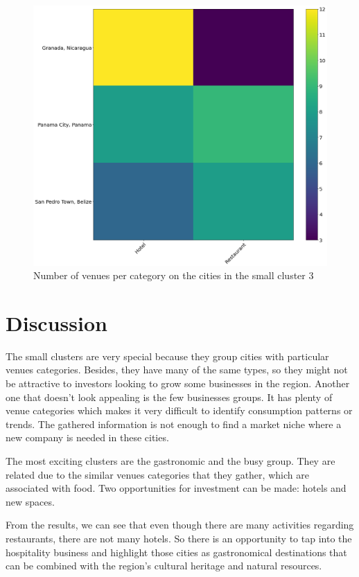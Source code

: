 \documentclass[letterpaper,12pt]{article}
\begin{document}
\begin{figure}[h]
    \centering
    \includegraphics[width=\textwidth]{images/cluster6.png}
    \caption{Number of venues per category on the cities in the small cluster 3}
    \label{fig:cluster_5}
\end{figure}



\section{Discussion}

The small clusters are very special because they group cities with particular venues categories. Besides, they have many of the same types, so they might not be attractive to investors looking to grow some businesses in the region. Another one that doesn't look appealing is the few businesses groups. It has plenty of venue categories which makes it very difficult to identify consumption patterns or trends. The gathered information is not enough to find a market niche where a new company is needed in these cities. 


The most exciting clusters are the gastronomic and the busy group. They are related due to the similar venues categories that they gather, which are associated with food. Two opportunities for investment can be made: hotels and new spaces.

From the results, we can see that even though there are many activities regarding restaurants, there are not many hotels. So there is an opportunity to tap into the hospitality business and highlight those cities as gastronomical destinations that can be combined with the region's cultural heritage and natural resources. 
\end{document}
